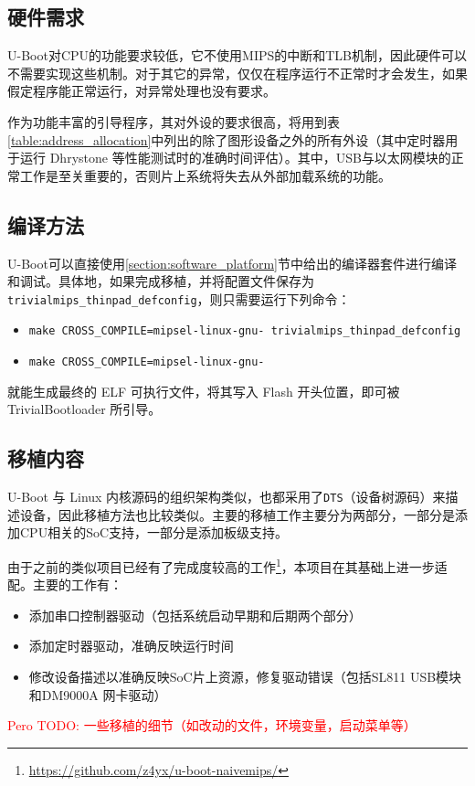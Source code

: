 \subsection{硬件需求}

U-Boot对CPU的功能要求较低，它不使用MIPS的中断和TLB机制，因此硬件可以不需要实现这些机制。对于其它的异常，仅仅在程序运行不正常时才会发生，如果假定程序能正常运行，对异常处理也没有要求。

作为功能丰富的引导程序，其对外设的要求很高，将用到表\ref{table:address_allocation}中列出的除了图形设备之外的所有外设（其中定时器用于运行 Dhrystone 等性能测试时的准确时间评估）。其中，USB与以太网模块的正常工作是至关重要的，否则片上系统将失去从外部加载系统的功能。

\subsection{编译方法}

U-Boot可以直接使用\ref{section:software_platform}节中给出的编译器套件进行编译和调试。具体地，如果完成移植，并将配置文件保存为 \texttt{trivialmips\_thinpad\_defconfig}，则只需要运行下列命令：

\begin{itemize}
    \item \texttt{make\ CROSS\_COMPILE=mipsel-linux-gnu- trivialmips\_thinpad\_defconfig}
    \item \texttt{make CROSS\_COMPILE=mipsel-linux-gnu- }
\end{itemize}

就能生成最终的 ELF 可执行文件，将其写入 Flash 开头位置，即可被 TrivialBootloader 所引导。

\subsection{移植内容}

U-Boot 与 Linux 内核源码的组织架构类似，也都采用了\texttt{DTS}（设备树源码）来描述设备，因此移植方法也比较类似。主要的移植工作主要分为两部分，一部分是添加CPU相关的SoC支持，一部分是添加板级支持。

由于之前的类似项目已经有了完成度较高的工作\footnote{\url{https://github.com/z4yx/u-boot-naivemips/}}，本项目在其基础上进一步适配。主要的工作有：

\begin{itemize}
    \item 添加串口控制器驱动（包括系统启动早期和后期两个部分）
    \item 添加定时器驱动，准确反映运行时间
    \item 修改设备描述以准确反映SoC片上资源，修复驱动错误（包括SL811 USB模块和DM9000A 网卡驱动）
\end{itemize}

\textcolor{red}{Pero TODO: 一些移植的细节（如改动的文件，环境变量，启动菜单等）}